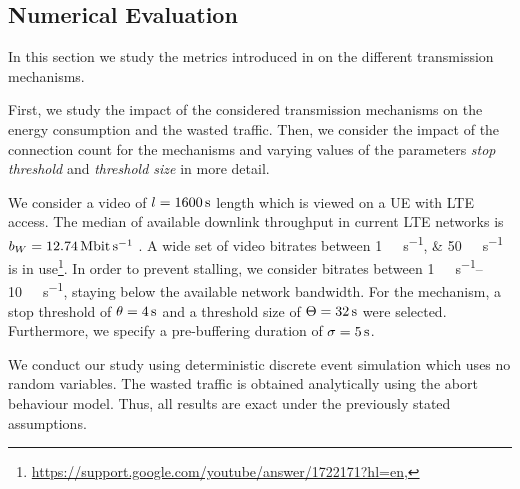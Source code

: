 \subsection{Numerical Evaluation}\label{sec:application:lte_video:numerical_evaluation}

In this section we study the metrics introduced in  on the different transmission mechanisms.

First, we study the impact of the considered transmission mechanisms on the energy consumption and the wasted traffic. 
Then, we consider the impact of the connection count for the \streaming mechanisms and varying values of the parameters \emph{stop threshold} \bufferlower and \emph{threshold size} \buffersize in more detail.

We consider a video of \(l=\SI{1600}{\second}\) length which is viewed on a \gls{UE} with \gls{LTE} access.
The median of available downlink throughput in current \gls{LTE} networks is \(\bandwidth = \SI{12.74}{\mega\bit\per\second}\) \cite{Huang2012}.
A wide set of video bitrates between \SIlist{1;50}{\mega\bit\per\second} is in use\footnote{\url{https://support.google.com/youtube/answer/1722171?hl=en}, \accessed}.
In order to prevent stalling, we consider bitrates between \SIrange{1}{10}{\mega\bit\per\second}, staying below the available network bandwidth.
For the \streaming mechanism, a stop threshold of \(\theta = \SI{4}{\second}\) and a threshold size of \(\Theta = \SI{32}{\second}\) were selected.
Furthermore, we specify a pre-buffering duration of \(\sigma = \SI{5}{\second}\).

We conduct our study using deterministic discrete event simulation which uses no random variables.
The wasted traffic is obtained analytically using the abort behaviour model.
Thus, all results are exact under the previously stated assumptions.

